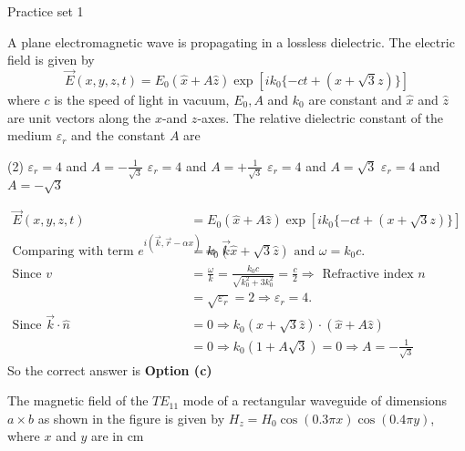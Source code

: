 
\begin{abox}
	Practice set 1
\end{abox}
\begin{enumerate}
	\begin{minipage}{\textwidth}
		\item A plane electromagnetic wave is propagating in a lossless dielectric. The electric field is given by
		$$
		\vec{E}(x, y, z, t)=E_{0}(\hat{x}+A \hat{z}) \exp \left[i k_{0}\{-c t+(x+\sqrt{3} z)\}\right]
		$$
		where $c$ is the speed of light in vacuum, $E_{0}, A$ and $k_{0}$ are constant and $\hat{x}$ and $\hat{z}$ are unit vectors along the $x$-and $z$-axes. The relative dielectric constant of the medium $\varepsilon_{r}$ and the constant $A$ are
	\end{minipage}
	\begin{tasks}(2)
		\task[\textbf{a.}]$\varepsilon_{r}=4$ and $A=-\frac{1}{\sqrt{3}}$
		\task[\textbf{b.}]$\varepsilon_{r}=4$ and $A=+\frac{1}{\sqrt{3}}$
		\task[\textbf{c.}]$\varepsilon_{r}=4$ and $A=\sqrt{3}$
		\task[\textbf{d.}]$\varepsilon_{r}=4$ and $A=-\sqrt{3}$
	\end{tasks}
\begin{answer}
	\begin{align*}
	\vec{E}(x, y, z, t)&=E_{0}(\hat{x}+A \hat{z}) \exp \left[i k_{0}\{-c t+(x+\sqrt{3} z)\}\right]\\
	\text{Comparing with term }e^{i(\vec{k}, \vec{r}-\alpha x)} \Rightarrow \vec{k}&=k_{0}(\hat{x}+\sqrt{3} \hat{z})\text{ and }\omega=k_{0} c.\\
	\text{Since }v&=\frac{\omega}{k}=\frac{k_{0} c}{\sqrt{k_{0}^{2}+3 k_{0}^{2}}}=\frac{c}{2} \Rightarrow\text{ Refractive index }n\\&=\sqrt{\varepsilon_{r}}=2 \Rightarrow \varepsilon_{r}=4.\\
	\text{Since }\vec{k} \cdot \hat{n}&=0 \Rightarrow k_{0}(\hat{x}+\sqrt{3} \hat{z}) \cdot(\hat{x}+A \hat{z})\\&=0 \Rightarrow k_{0}(1+A \sqrt{3})=0 \Rightarrow A=-\frac{1}{\sqrt{3}}
	\end{align*}
	So the correct answer is \textbf{Option (c)}
\end{answer}
	\begin{minipage}{\textwidth}
		\item The magnetic field of the $T E_{11}$ mode of a rectangular waveguide of dimensions $a \times b$ as shown in the figure is given by $H_{z}=H_{0} \cos (0.3 \pi x) \cos (0.4 \pi y)$, where $x$ and $y$ are in cm

\end{minipage}
\end{enumerate}
